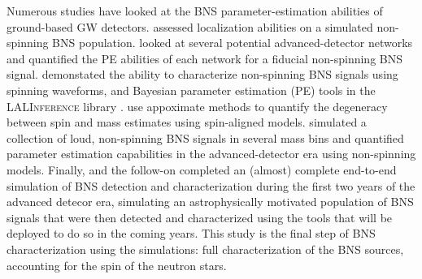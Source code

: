 Numerous studies have looked at the BNS parameter-estimation abilities of ground-based GW detectors. \citet{Nissanke_2010,Nissanke_2011} assessed localization abilities on a simulated non-spinning BNS population.  \citet{Veitch_2012} looked at several potential advanced-detector networks and quantified the PE abilities of each network for a fiducial non-spinning BNS signal.  \citet{Aasi_2013} demonstated the ability to characterize non-spinning BNS signals using spinning waveforms, and Bayesian parameter estimation (PE) tools in the \textsc{LALInference} library \cite{Veitch_2014}.   \citet{Hannam_2013} use appoximate methods to quantify the degeneracy between spin and mass estimates using spin-aligned models.  \citet{Rodriguez_2014} simulated a collection of loud, non-spinning BNS signals in several mass bins and quantified parameter estimation capabilities in the advanced-detector era using non-spinning models.  Finally, \citet{Singer_2014} and the follow-on \citet{Berry_2014} completed an (almost) complete end-to-end simulation of BNS detection and characterization during the first two years of the advanced detecor era, simulating an astrophysically motivated population of BNS signals that were then detected and characterized using the tools that will be deployed to do so in the coming years.  This study is the final step of BNS characterization using the \citet{Singer_2014} simulations: full characterization of the BNS sources, accounting for the spin of the neutron stars.